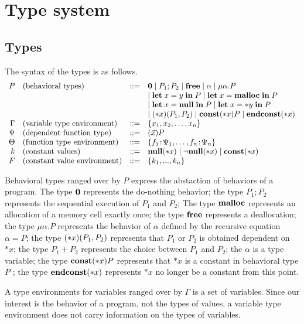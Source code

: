 \section{Type system}
\label{sec:typesystem}

\subsection{Types}
The syntax of the types is as follows.
\[
\begin{array}{rlcl}
  P & (\mbox{behavioral types})&::=& {\bf 0} \mid P_{1};P_{2} \mid \mathbf{free} \mid \alpha \mid \mu\alpha.P \\
  &  &  & \mid \mathbf{let}\; x = y \; \mathbf{in}\; P \mid \mathbf{let}\; x = \mathbf{malloc} \; \mathbf{in}\; P \\
   &  &  & \mid \mathbf{let}\; x = \mathbf{null} \; \mathbf{in}\; P \mid \mathbf{let}\; x = *y \; \mathbf{in}\; P \\
  &  &  & \mid (*x)(P_1,P_2) \mid \mathbf{const}(*x) P  \mid \mathbf{endconst}(*x)\\
  \Gamma & (\mbox{variable type environment}) &::=& \{x_1, x_2, \dots, x_n\}\\
  \Psi & (\mbox{dependent function type}) &::=& (\vec{x})P\\
  \Theta & (\mbox{function type environment}) &::=& \{f_1\!:\! \Psi_1,\dots,f_n\!:\! \Psi_n\}\\
  k & (\mbox{constant values}) &::=& {\bf null}(*x) \mid \neg{\bf null}(*x) \mid \mathbf{const}(*x)   \\
  F & (\mbox{constant value environment}) &::=& \{k_1,...,k_n\} \\
\end{array}
\]

Behavioral types ranged over by \(P\) express the abstaction of
behaviors of a program. The type \({\bf 0}\) represents the do-nothing
behavior; the type \(P_1;P_2\) represents the sequential execution of
\(P_1\) and \(P_2\); The type \(\mathbf{malloc}\) represents an allocation of
a memory cell exactly once; the type \(\mathbf{free}\) represents a
deallocation; the type \(\mu \alpha.P\) represents the behavior of
\(\alpha\) defined by the recursive equation \(\alpha = P\); the type
\((*x)(P_1,P_2)\) represents that \(P_1\) or \(P_2\) is obtained
dependent on \(*x\); the type \(P_1 + P_2\) represents the choice
between \(P_1\) and \(P_2\); the \(\alpha\) is a type variable; the
type \(\mathbf{const}(*x) P\) represents that \(*x\) is a constant in behavioral
type \(P\) ; the type \(\mathbf{endconst}(*x)\) represents \(*x\) no longer be a
constant from this point.

A type environments for variables ranged over by \(\Gamma\) is a set
of variables.  Since our interest is the behavior of a program, not
the types of values, a variable type environment does not carry
information on the types of variables.

